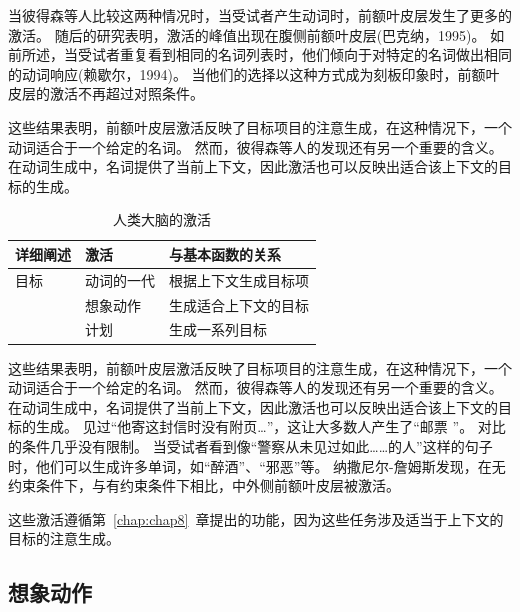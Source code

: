 当彼得森等人比较这两种情况时，当受试者产生动词时，前额叶皮层发生了更多的激活。
随后的研究表明，激活的峰值出现在腹侧前额叶皮层(巴克纳，1995)。
如前所述，当受试者重复看到相同的名词列表时，他们倾向于对特定的名词做出相同的动词响应(赖歇尔，1994)。
当他们的选择以这种方式成为刻板印象时，前额叶皮层的激活不再超过对照条件。
\par


这些结果表明，前额叶皮层激活反映了目标项目的注意生成，在这种情况下，一个动词适合于一个给定的名词。
然而，彼得森等人的发现还有另一个重要的含义。
在动词生成中，名词提供了当前上下文，因此激活也可以反映出适合该上下文的目标的生成。
\par


\begin{table}[htbp] 
	\newcommand{\tabincell}[2]{\begin{tabular}{@{}#1@{}}#2\end{tabular}} %
	\centering
	\caption{人类大脑的激活\label{tab:9_2}}
	\renewcommand\arraystretch{1.5}	%
	\begin{tabular}{lll}
		\toprule
		详细阐述 & 激活 & 与基本函数的关系\\
		\midrule
		目标 & 动词的一代 & 根据上下文生成目标项  \\
		& 想象动作 & 生成适合上下文的目标 \\
		&  计划 & 生成一系列目标 \\
		\bottomrule
		
	\end{tabular}%
\end{table}%


这些结果表明，前额叶皮层激活反映了目标项目的注意生成，在这种情况下，一个动词适合于一个给定的名词。
然而，彼得森等人的发现还有另一个重要的含义。
在动词生成中，名词提供了当前上下文，因此激活也可以反映出适合该上下文的目标的生成。
见过“他寄这封信时没有附页…”，这让大多数人产生了“邮票 ”。
对比的条件几乎没有限制。
当受试者看到像“警察从未见过如此……的人”这样的句子时，他们可以生成许多单词，如“醉酒”、“邪恶”等。
纳撒尼尔-詹姆斯发现，在无约束条件下，与有约束条件下相比，中外侧前额叶皮层被激活。
\par


这些激活遵循第~\ref{chap:chap8}~章提出的功能，因为这些任务涉及适当于上下文的目标的注意生成。



\subsection{想象动作}

